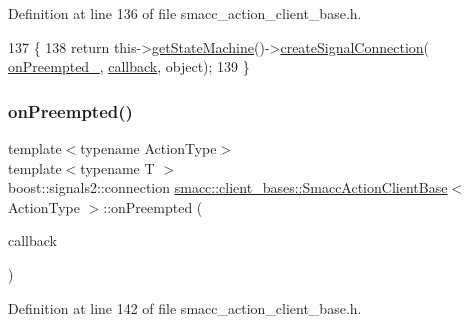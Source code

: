 Definition at line 136 of file smacc\+\_\+action\+\_\+client\+\_\+base.\+h.


\begin{DoxyCode}
137     \{
138         \textcolor{keywordflow}{return} this->\hyperlink{classsmacc_1_1ISmaccClient_aec51d4712404cb9882b86e4c854bb93a}{getStateMachine}()->\hyperlink{classsmacc_1_1ISmaccStateMachine_adf0f42ade0c65cc471960fe2a7c42da2}{createSignalConnection}(
      \hyperlink{classsmacc_1_1client__bases_1_1SmaccActionClientBase_a23846f928b48b5da809690883044b14b}{onPreempted\_}, \hyperlink{sm__ridgeback__barrel__search__1_2servers_2opencv__perception__node_2opencv__perception__node_8cpp_a050e697bd654facce10ea3f6549669b3}{callback}, \textcolor{keywordtype}{object});
139     \}
\end{DoxyCode}
\mbox{\label{classsmacc_1_1client__bases_1_1SmaccActionClientBase_a2941fe4e9a24a7862fd1cfbc63cbfcfa}} 
\subsubsection{\texorpdfstring{on\+Preempted()}{onPreempted()}\hspace{0.1cm}{\footnotesize\ttfamily [2/2]}}
{\footnotesize\ttfamily template$<$typename Action\+Type$>$ \\
template$<$typename T $>$ \\
boost\+::signals2\+::connection \hyperlink{classsmacc_1_1client__bases_1_1SmaccActionClientBase}{smacc\+::client\+\_\+bases\+::\+Smacc\+Action\+Client\+Base}$<$ Action\+Type $>$\+::on\+Preempted (\begin{DoxyParamCaption}\item[{std\+::function$<$ void(Result\+Const\+Ptr \&)$>$}]{callback }\end{DoxyParamCaption})\hspace{0.3cm}{\ttfamily [inline]}}



Definition at line 142 of file smacc\+\_\+action\+\_\+client\+\_\+base.\+h.


